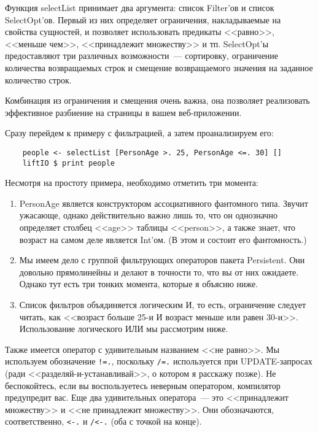 Функция selectList принимает два аргумента: список Filter'ов и список SelectOpt'ов. Первый из них определяет ограничения, накладываемые на свойства сущностей, и позволяет использовать предикаты <<равно>>, <<меньше чем>>, <<принадлежит множеству>> и тп. SelectOpt'ы предоставляют три различных возможности~--- сортировку, ограничение количества возвращаемых строк и смещение возвращаемого значения на заданное количество строк.

\begin{remark}
Комбинация из ограничения и смещения очень важна, она позволяет реализовать эффективное разбиение на страницы в вашем веб-приложении.
\end{remark}

Сразу перейдем к примеру с фильтрацией, а затем проанализируем его:

\begin{lstlisting}
    people <- selectList [PersonAge >. 25, PersonAge <=. 30] []
    liftIO $ print people
\end{lstlisting}%

Несмотря на простоту примера, необходимо отметить три момента:

\begin{enumerate}
\item PersonAge является конструктором ассоциативного фантомного типа. Звучит ужасающе, однако действительно важно лишь то, что он однозначно определяет столбец <<age>> таблицы <<person>>, а также знает, что возраст на самом деле является Int'ом. (В этом и состоит его фантомность.)
\item Мы имеем дело с группой фильтрующих операторов пакета Persistent. Они довольно прямолинейны и делают в точности то, что вы от них ожидаете. Однако тут есть три тонких момента, которые я объясню ниже.
\item Список фильтров объядиняется логическим И, то есть, ограничение следует читать, как <<возраст больше 25-и И возраст меньше или равен 30-и>>. Использование логического ИЛИ мы рассмотрим ниже.
\end{enumerate}

Также имеется оператор с удивительным названием <<не равно>>. Мы используем обозначение \lstinline'!=.', поскольку \lstinline'/=.' используется при UPDATE-запросах (ради <<разделяй-и-устанавливай>>, о котором я расскажу позже). Не беспокойтесь, если вы воспользуетесь неверным оператором, компилятор предупредит вас. Еще два удивительных оператора~--- это <<принадлежит множеству>> и <<не принадлежит множеству>>. Они обозначаются, соответственно, \lstinline'<-.' и \lstinline'/<-.' (оба с точкой на конце).

